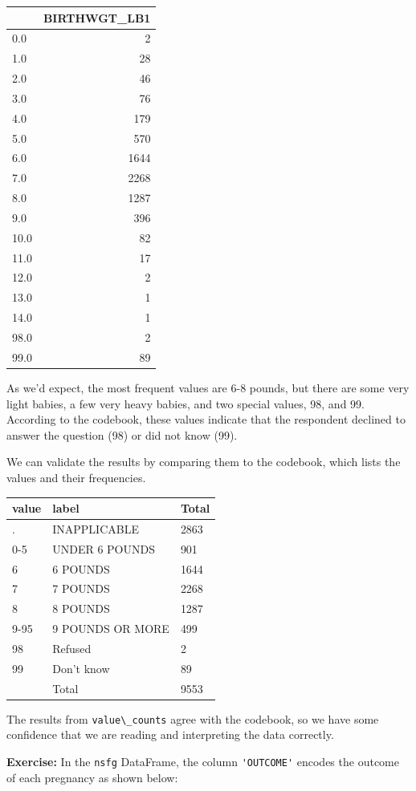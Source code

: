 \begin{tabular}{lr}
\midrule
{} &  BIRTHWGT\_LB1 \\
\midrule
0.0  &             2 \\
1.0  &            28 \\
2.0  &            46 \\
3.0  &            76 \\
4.0  &           179 \\
5.0  &           570 \\
6.0  &          1644 \\
7.0  &          2268 \\
8.0  &          1287 \\
9.0  &           396 \\
10.0 &            82 \\
11.0 &            17 \\
12.0 &             2 \\
13.0 &             1 \\
14.0 &             1 \\
98.0 &             2 \\
99.0 &            89 \\
\midrule
\end{tabular}

As we'd expect, the most frequent values are 6-8 pounds, but there are
some very light babies, a few very heavy babies, and two special values,
98, and 99. According to the codebook, these values indicate that the
respondent declined to answer the question (98) or did not know (99).

We can validate the results by comparing them to the codebook, which
lists the values and their frequencies.

\begin{longtable}[]{@{}lll@{}}
\midrule
value & label & Total\tabularnewline
\midrule
\endhead
. & INAPPLICABLE & 2863\tabularnewline
0-5 & UNDER 6 POUNDS & 901\tabularnewline
6 & 6 POUNDS & 1644\tabularnewline
7 & 7 POUNDS & 2268\tabularnewline
8 & 8 POUNDS & 1287\tabularnewline
9-95 & 9 POUNDS OR MORE & 499\tabularnewline
98 & Refused & 2\tabularnewline
99 & Don't know & 89\tabularnewline
& Total & 9553\tabularnewline
\midrule
\end{longtable}

The results from \passthrough{\lstinline!value\_counts!} agree with the
codebook, so we have some confidence that we are reading and
interpreting the data correctly.

\textbf{Exercise:} In the \passthrough{\lstinline!nsfg!} DataFrame, the
column \passthrough{\lstinline!'OUTCOME'!} encodes the outcome of each
pregnancy as shown below:

